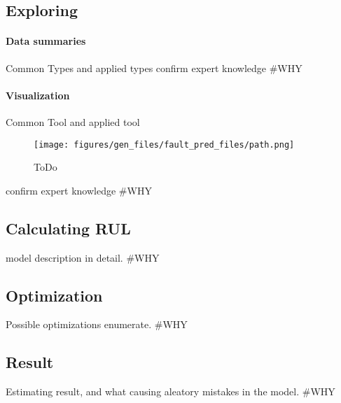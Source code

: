 	\subsection{Exploring}
		\paragraph{Data summaries}
		Common Types and applied types
		confirm expert knowledge
		\#WHY
		\paragraph{Visualization}
		Common Tool and applied tool
			\begin{figure}[!ht]
			\centering
			\texttt{[image: figures/gen\_files/fault\_pred\_files/path.png]}
			\caption{ToDo} 
			\end{figure}
		confirm expert knowledge
\#WHY
	\subsection{Calculating RUL}
model description in detail.
\#WHY
	\subsection{Optimization}
Possible optimizations enumerate.
\#WHY
	\subsection{Result}
Estimating result, and what causing aleatory mistakes in the model. 
\#WHY
\cite{GitHub_FP_RUL}